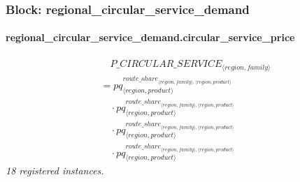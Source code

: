 \documentclass[11pt]{article}
\begin{document}
\subsubsection*{Block: regional\_circular\_service\_demand}
\paragraph{regional\_circular\_service\_demand.circular\_service\_price}
\begin{align*}
&\quad {P\_CIRCULAR\_SERVICE}_{\langle region, family\rangle}\\
&= pq_{\langle region, product\rangle}^{{route\_share}_{\langle region, family\rangle,\langle region, product\rangle}}\\
&\quad {}\cdot pq_{\langle region, product\rangle}^{{route\_share}_{\langle region, family\rangle,\langle region, product\rangle}}\\
&\quad {}\cdot pq_{\langle region, product\rangle}^{{route\_share}_{\langle region, family\rangle,\langle region, product\rangle}}\\
&\quad {}\cdot pq_{\langle region, product\rangle}^{{route\_share}_{\langle region, family\rangle,\langle region, product\rangle}}
\end{align*}
\noindent\emph{18 registered instances.}\par
\end{document}
